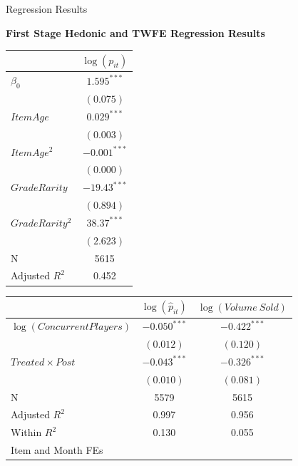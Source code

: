 \documentclass[xcolor=table, envcountsect,12pt]{beamer}
\theoremstyle{remark}
\theoremstyle{theorem}
\theoremstyle{plain}
\begin{document}
\begin{frame}[shrink=35]{Regression Results}
	\begin{table}[ht!]
	  \renewcommand{\arraystretch}{1.25}%
	  \begin{center}
	  \textbf{First Stage Hedonic and TWFE Regression Results}

	  \begin{tabular}[t]{lc}
	    \hline
	     & \(\log(p_{it})\) \\ \toprule
	    \(\beta_0\)         & $1.595^{***}$ \\
	                        & $(0.075)$ \\
	    $ItemAge$           & $0.029^{***}$ \\ 
	                        & $(0.003)$ \\
	    $ItemAge^2$         & $-0.001^{***}$ \\
	                        & $(0.000)$ \\
	    $GradeRarity$       & $-19.43^{***}$ \\ 
	                        & $( 0.894)$ \\
	    $GradeRarity^2$     & $38.37^{***}$ \\
	                        & $(2.623)$ \\ \hline
	    N                   & 5615 \\
	    Adjusted \(R^2\)    & 0.452 \\ 
	    \bottomrule
	  \end{tabular}
	  \quad
	  \begin{tabular}[t]{lcc}
	    \hline
	                                        & \(\log(\hat{p}_{it})\) & \(\log(Volume \: Sold)\) \\ \toprule
	    $\log(ConcurrentPlayers)$           & $-0.050^{***}$         & $-0.422^{***}$ \\ 
	                                        & $(0.012)$              & $(0.120)$ \\
	    $Treated\times Post$                & $-0.043^{***}$         & $-0.326^{***}$ \\
	                                        & $(0.010)$              & $(0.081)$ \\ \hline
	    N                                   & 5579                   & 5615 \\
	    Adjusted \(R^2\)                    & 0.997                  & 0.956 \\
	    Within \(R^2\)                      & 0.130                  & 0.055 \\ \hline
	    Item and Month FEs                  & \checkmark             & \checkmark \\
	    \bottomrule
	  \end{tabular}
	\vspace{2mm}


\end{center}
\end{table}
\end{frame}
\end{document}
